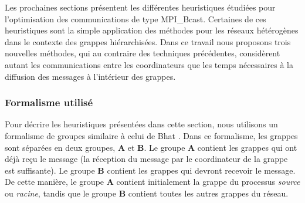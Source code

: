 
Les prochaines sections présentent les différentes heuristiques étudiées
pour l'optimisation des communications de type MPI\_Bcast. Certaines
de ces heuristiques sont la simple application des méthodes pour les
réseaux hétérogènes dans le contexte des grappes hiérarchisées. Dans
ce travail nous proposons trois nouvelles méthodes, qui au contraire
des techniques précédentes, considèrent autant les communications
entre les coordinateurs que les temps nécessaires à la diffusion des
messages à l'intérieur des grappes.


\subsubsection*{Formalisme utilisé}

Pour décrire les heuristiques présentées dans cette section, nous
utilisons un formalisme de groupes similaire à celui de Bhat \cite{Bhat03}.
Dans ce formalisme, les grappes sont séparées en deux groupes, \textbf{A}
et \textbf{B}. Le groupe \textbf{A} contient les grappes qui ont déjà
reçu le message (la réception du message par le coordinateur de la
grappe est suffisante). Le groupe \textbf{B} contient les grappes
qui devront recevoir le message. De cette manière, le groupe \textbf{A}
contient initialement la grappe du processus \emph{source} ou \emph{racine},
tandis que le groupe \textbf{B} contient toutes les autres grappes
du réseau.

